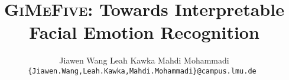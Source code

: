 \documentclass[10pt,twocolumn,letterpaper]{article}
\title{\textsc{GiMeFive}: Towards Interpretable Facial Emotion Recognition}
\author{
Jiawen Wang
\qquad
Leah Kawka
\qquad
Mahdi Mohammadi \\
\tt\small\{Jiawen.Wang,Leah.Kawka,Mahdi.Mohammadi\}@campus.lmu.de
}
\begin{document}
\maketitle
    


{
    \small
    
    
}
\end{document}
